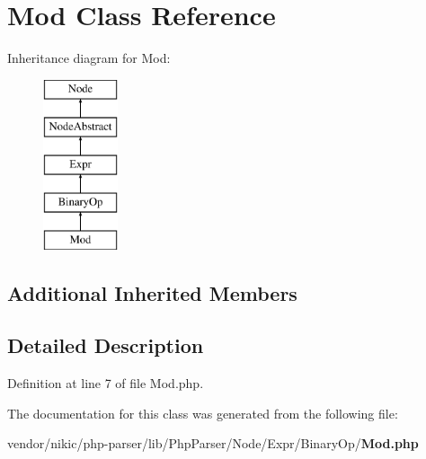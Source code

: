 \section{Mod Class Reference}
\label{class_php_parser_1_1_node_1_1_expr_1_1_binary_op_1_1_mod}
Inheritance diagram for Mod\+:\begin{figure}[H]
\begin{center}
\leavevmode
\includegraphics[height=5.000000cm]{class_php_parser_1_1_node_1_1_expr_1_1_binary_op_1_1_mod}
\end{center}
\end{figure}
\subsection*{Additional Inherited Members}


\subsection{Detailed Description}


Definition at line 7 of file Mod.\+php.



The documentation for this class was generated from the following file\+:\begin{DoxyCompactItemize}
\item 
vendor/nikic/php-\/parser/lib/\+Php\+Parser/\+Node/\+Expr/\+Binary\+Op/{\bf Mod.\+php}\end{DoxyCompactItemize}
